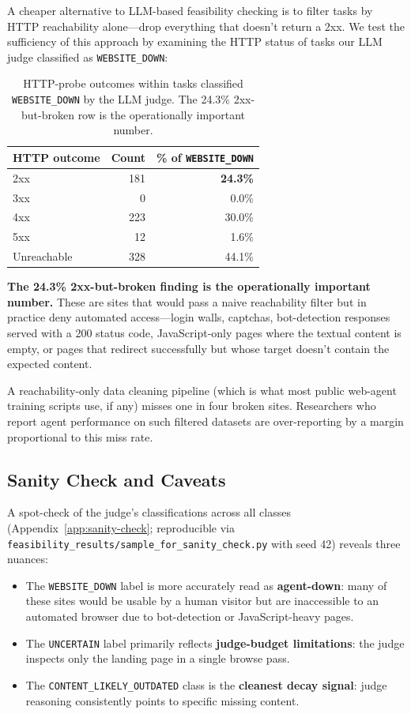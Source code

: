 \documentclass[12pt,a4paper]{report}
\begin{document}
A cheaper alternative to LLM-based feasibility checking is to filter tasks by HTTP reachability alone---drop everything that doesn't return a 2xx. We test the sufficiency of this approach by examining the HTTP status of tasks our LLM judge classified as \texttt{WEBSITE\_DOWN}:

\begin{table}[h]
\centering
\begin{tabular}{lrr}
\toprule
\textbf{HTTP outcome} & \textbf{Count} & \textbf{\% of \texttt{WEBSITE\_DOWN}} \\
\midrule
2xx & 181 & \textbf{24.3\%} \\
3xx & 0 & 0.0\% \\
4xx & 223 & 30.0\% \\
5xx & 12 & 1.6\% \\
Unreachable & 328 & 44.1\% \\
\bottomrule
\end{tabular}
\caption{HTTP-probe outcomes within tasks classified \texttt{WEBSITE\_DOWN} by the LLM judge. The 24.3\% 2xx-but-broken row is the operationally important number.}
\label{tab:http-mismatch}
\end{table}

\textbf{The 24.3\% 2xx-but-broken finding is the operationally important number.} These are sites that would pass a naive reachability filter but in practice deny automated access---login walls, captchas, bot-detection responses served with a 200 status code, JavaScript-only pages where the textual content is empty, or pages that redirect successfully but whose target doesn't contain the expected content.

A reachability-only data cleaning pipeline (which is what most public web-agent training scripts use, if any) misses one in four broken sites. Researchers who report agent performance on such filtered datasets are over-reporting by a margin proportional to this miss rate.

\subsection{Sanity Check and Caveats}

A spot-check of the judge's classifications across all classes (Appendix~\ref{app:sanity-check}; reproducible via \texttt{feasibility\_results/sample\_for\_sanity\_check.py} with seed 42) reveals three nuances:

\begin{itemize}
  \item The \texttt{WEBSITE\_DOWN} label is more accurately read as \textbf{agent-down}: many of these sites would be usable by a human visitor but are inaccessible to an automated browser due to bot-detection or JavaScript-heavy pages.
  \item The \texttt{UNCERTAIN} label primarily reflects \textbf{judge-budget limitations}: the judge inspects only the landing page in a single browse pass.
  \item The \texttt{CONTENT\_LIKELY\_OUTDATED} class is the \textbf{cleanest decay signal}: judge reasoning consistently points to specific missing content.
\end{itemize}
\end{document}
